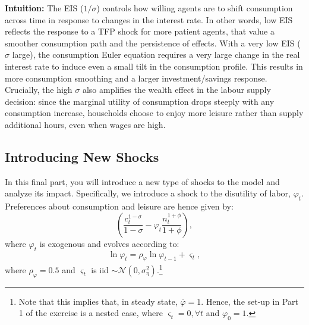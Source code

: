 \documentclass[dvipsnames,11pt]{article}
\begin{document}
\begin{enumerate}
\begin{solution}
                    \textbf{Intuition:} The EIS ($1/\sigma$) controls how willing agents are to shift consumption across time in response to changes in the interest rate. In other words, low EIS reflects the response to a TFP shock for more patient agents, that value a smoother consumption path and the persistence of effects.  With a very low EIS ($\sigma$ large), the consumption Euler equation requires a very large change in the real interest rate to induce even a small tilt in the consumption profile.  This results in more consumption smoothing and a larger investment/savings response.  Crucially, the high $\sigma$ also amplifies the wealth effect in the labour supply decision: since the marginal utility of consumption drops steeply with any consumption increase, households choose to enjoy more leisure rather than supply additional hours, even when wages are high.
                    
                \end{solution}
        
        \end{enumerate}


    \subsection{Introducing New Shocks}

        In this final part, you will introduce a new type of shocks to the model and analyze its impact. Specifically, we introduce a shock to the disutility of labor, $\varphi_t$. Preferences about consumption and leisure are hence given by:
        \[
        \left( \frac{c_t^{1-\sigma}}{1 - \sigma} - \varphi_t \frac{n_t^{1+\phi}}{1 + \phi} \right),
        \]
        where $\varphi_t$ is exogenous and evolves according to:
        \[
        \ln \varphi_t = \rho_{\varphi} \ln \varphi_{t-1} + \varsigma_t,
        \]
        where $\rho_{\varphi} = 0.5$ and $\varsigma_t$ is iid $\sim \mathcal{N}(0, \sigma^2_\eta)$.\footnote{Note that this implies that, in steady state, $\overline{\varphi} = 1$. Hence, the set-up in Part 1 of the exercise is a nested case, where $\varsigma_t = 0, \forall t$ and $\varphi_0 = 1$. }
       
\end{document}
